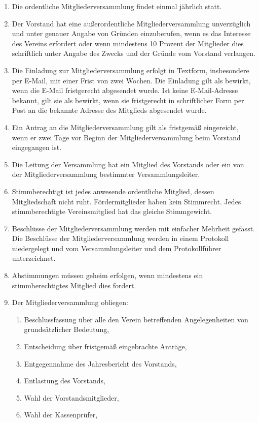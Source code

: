 \documentclass[12pt,a4paper,titlepage]{scrartcl}
\begin{document}
\begin{enumerate}
\item Die ordentliche Mitgliederversammlung findet einmal jährlich statt.
\item Der Vorstand hat eine außerordentliche Mitgliederversammlung unverzüglich und unter genauer Angabe von Gründen einzuberufen, wenn es das Interesse des Vereins erfordert oder wenn mindestens 10 Prozent der Mitglieder dies schriftlich unter Angabe des Zwecks und der Gründe vom Vorstand verlangen.
\item Die Einladung zur Mitgliederversammlung erfolgt in Textform, insbesondere per E-Mail, mit einer Frist von zwei Wochen. Die Einladung gilt als bewirkt, wenn die E-Mail fristgerecht abgesendet wurde. Ist keine E-Mail-Adresse bekannt, gilt sie als bewirkt, wenn sie fristgerecht in schriftlicher Form per Post an die bekannte Adresse des Mitglieds abgesendet wurde.
\item Ein Antrag an die Mitgliederversammlung gilt als fristgemäß eingereicht, wenn er zwei Tage vor Beginn der Mitgliederversammlung beim Vorstand eingegangen ist.
\item Die Leitung der Versammlung hat ein Mitglied des Vorstands oder ein von der Mitgliederversammlung bestimmter Versammlungsleiter.
\item Stimmberechtigt ist jedes anwesende ordentliche Mitglied, dessen Mitgliedschaft nicht ruht. Fördermitglieder haben kein Stimmrecht. Jedes stimmberechtigte Vereinsmitglied hat das gleiche Stimmgewicht.
\item  Beschlüsse der Mitgliederversammlung werden mit einfacher Mehrheit gefasst. Die Beschlüsse der Mitgliederversammlung werden in einem Protokoll niedergelegt und vom Versammlungsleiter und dem Protokollführer unterzeichnet.
\item Abstimmungen müssen geheim erfolgen, wenn mindestens ein stimmberechtigtes Mitglied dies fordert.
\item Der Mitgliederversammlung obliegen:
\begin{enumerate}
\item Beschlussfassung über alle den Verein betreffenden Angelegenheiten von grundsätzlicher Bedeutung,
\item Entscheidung über fristgemäß eingebrachte Anträge,
\item Entgegennahme des Jahresbericht des Vorstands,
\item Entlastung des Vorstands,
\item Wahl der Vorstandsmitglieder,
\item Wahl der Kassenprüfer,

\end{enumerate}
\end{enumerate}
\end{document}
